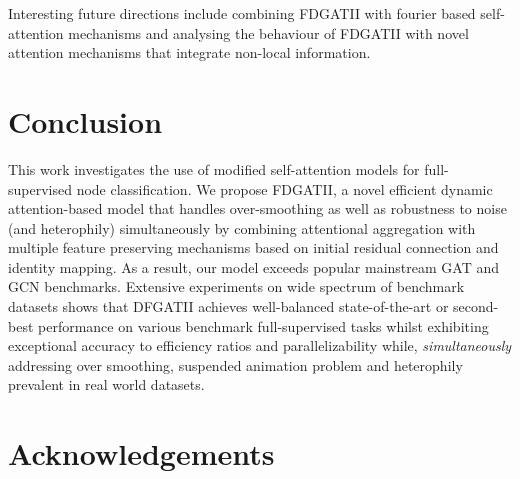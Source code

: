 \documentclass{article}
\begin{document}
Interesting future directions include combining FDGATII with fourier  based self-attention mechanisms \cite{lee2021fnet} and analysing the behaviour of FDGATII with novel attention mechanisms that integrate non-local information. 

\section{Conclusion}
This work investigates the use of modified self-attention models for full-supervised node classification. We propose FDGATII, a novel efficient  dynamic attention-based model that handles over-smoothing as well as robustness to noise (and heterophily) simultaneously by combining attentional aggregation with multiple feature preserving mechanisms based on initial residual connection and identity mapping. As a result, our model exceeds popular mainstream GAT and GCN benchmarks. Extensive experiments on wide spectrum of benchmark datasets shows that DFGATII achieves well-balanced state-of-the-art or second-best performance on various benchmark full-supervised tasks whilst exhibiting exceptional accuracy to efficiency ratios and parallelizability while, \textit{simultaneously} addressing over smoothing, suspended animation problem and heterophily prevalent in real world datasets.

\section*{Acknowledgements}



\end{document}
